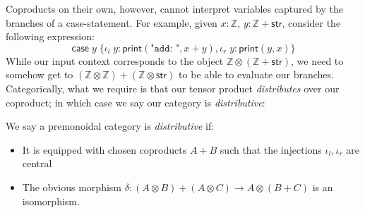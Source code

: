 \documentclass[acmsmall,screen,anonymous,review]{acmart}
\newcommand{\mbb}[1]{\ensuremath{\mathbb{#1}}}
\newcommand{\ms}[1]{\ensuremath{\mathsf{#1}}}
\newcommand{\lto}{:}
\newcommand{\linl}[1]{\iota_l\;{#1}}
\newcommand{\linr}[1]{\iota_r\;{#1}}
\newcommand{\caseexpr}[5]{\ms{case}\;#1\;\{\linl{#2} \lto #3, \linr{#4} \lto #5\}}
\begin{document}
Coproducts on their own, however, cannot interpret variables captured by the branches of a
case-statement. For example, given $x : \mbb{Z}$, $y : \mbb{Z} + \ms{str}$, consider the following
expression:
$$
\caseexpr{y}{y}{\ms{print}(\texttt{"add: "}, x + y)}{y}{\ms{print}(y, x)}
$$
While our input context corresponds to the object $\mbb{Z} \otimes (\mbb{Z} + \ms{str})$, we need to
somehow get to $(\mbb{Z} \otimes \mbb{Z}) + (\mbb{Z} \otimes \ms{str})$ to be able to evaluate our
branches. Categorically, what we require is that our tensor product \emph{distributes} over our
coproduct; in which case we say our category is \emph{distributive}:
\begin{definition}
  We say a premonoidal category is \emph{distributive} if:
  \begin{itemize}
    \item It is equipped with chosen coproducts $A + B$ such that the injections $\iota_l, \iota_r$
    are central
    \item The obvious morphism $\delta : (A \otimes B) + (A \otimes C) \to A \otimes (B + C)$ is an
    isomorphism.
  \end{itemize}
\end{definition}
\end{document}
